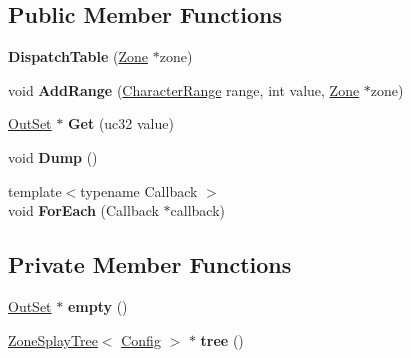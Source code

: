 \subsection*{Public Member Functions}
\begin{DoxyCompactItemize}
\item 
{\bfseries Dispatch\+Table} (\hyperlink{classv8_1_1internal_1_1_zone}{Zone} $\ast$zone)\hypertarget{classv8_1_1internal_1_1_dispatch_table_af4b64bc044ec5e385de4b27324604264}{}\label{classv8_1_1internal_1_1_dispatch_table_af4b64bc044ec5e385de4b27324604264}

\item 
void {\bfseries Add\+Range} (\hyperlink{classv8_1_1internal_1_1_character_range}{Character\+Range} range, int value, \hyperlink{classv8_1_1internal_1_1_zone}{Zone} $\ast$zone)\hypertarget{classv8_1_1internal_1_1_dispatch_table_a09e154202a1c257ae7a020333366c211}{}\label{classv8_1_1internal_1_1_dispatch_table_a09e154202a1c257ae7a020333366c211}

\item 
\hyperlink{classv8_1_1internal_1_1_out_set}{Out\+Set} $\ast$ {\bfseries Get} (uc32 value)\hypertarget{classv8_1_1internal_1_1_dispatch_table_a9c1164d1cf0666c48f59e151e5c36b0f}{}\label{classv8_1_1internal_1_1_dispatch_table_a9c1164d1cf0666c48f59e151e5c36b0f}

\item 
void {\bfseries Dump} ()\hypertarget{classv8_1_1internal_1_1_dispatch_table_ae34f706102818431e69470a710ce64c4}{}\label{classv8_1_1internal_1_1_dispatch_table_ae34f706102818431e69470a710ce64c4}

\item 
{\footnotesize template$<$typename Callback $>$ }\\void {\bfseries For\+Each} (Callback $\ast$callback)\hypertarget{classv8_1_1internal_1_1_dispatch_table_a600e5582b3e05d456c423454d61b0eba}{}\label{classv8_1_1internal_1_1_dispatch_table_a600e5582b3e05d456c423454d61b0eba}

\end{DoxyCompactItemize}
\subsection*{Private Member Functions}
\begin{DoxyCompactItemize}
\item 
\hyperlink{classv8_1_1internal_1_1_out_set}{Out\+Set} $\ast$ {\bfseries empty} ()\hypertarget{classv8_1_1internal_1_1_dispatch_table_a3ee03e51fdd6919f2a400c03255bdde6}{}\label{classv8_1_1internal_1_1_dispatch_table_a3ee03e51fdd6919f2a400c03255bdde6}

\item 
\hyperlink{classv8_1_1internal_1_1_zone_splay_tree}{Zone\+Splay\+Tree}$<$ \hyperlink{classv8_1_1internal_1_1_dispatch_table_1_1_config}{Config} $>$ $\ast$ {\bfseries tree} ()\hypertarget{classv8_1_1internal_1_1_dispatch_table_a773a711474ca98234a2fed6ebaeea2d0}{}\label{classv8_1_1internal_1_1_dispatch_table_a773a711474ca98234a2fed6ebaeea2d0}

\end{DoxyCompactItemize}
